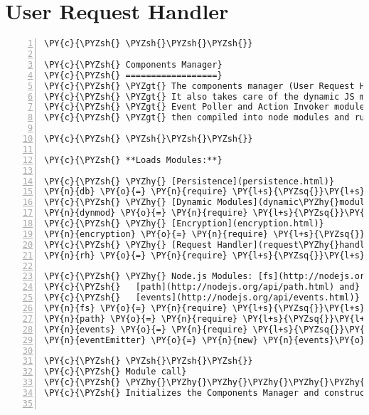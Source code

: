 \section{User Request Handler}
\begin{Verbatim}[fontsize=\scriptsize,commandchars=\\\{\},numbers=left,firstnumber=1,stepnumber=1]
\PY{c}{\PYZsh{} \PYZsh{}\PYZsh{}\PYZsh{}}

\PY{c}{\PYZsh{} Components Manager}
\PY{c}{\PYZsh{} ==================}
\PY{c}{\PYZsh{} \PYZgt{} The components manager (User Request Handler) is the interface for CRUD on ECA components.}
\PY{c}{\PYZsh{} \PYZgt{} It also takes care of the dynamic JS modules and the rules.}
\PY{c}{\PYZsh{} \PYZgt{} Event Poller and Action Invoker modules are loaded as strings and stored in the database,}
\PY{c}{\PYZsh{} \PYZgt{} then compiled into node modules and rules and used in the engine and event poller.}

\PY{c}{\PYZsh{} \PYZsh{}\PYZsh{}\PYZsh{}}

\PY{c}{\PYZsh{} **Loads Modules:**}

\PY{c}{\PYZsh{} \PYZhy{} [Persistence](persistence.html)}
\PY{n}{db} \PY{o}{=} \PY{n}{require} \PY{l+s}{\PYZsq{}}\PY{l+s}{./persistence}\PY{l+s}{\PYZsq{}}
\PY{c}{\PYZsh{} \PYZhy{} [Dynamic Modules](dynamic\PYZhy{}modules.html)}
\PY{n}{dynmod} \PY{o}{=} \PY{n}{require} \PY{l+s}{\PYZsq{}}\PY{l+s}{./dynamic\PYZhy{}modules}\PY{l+s}{\PYZsq{}}
\PY{c}{\PYZsh{} \PYZhy{} [Encryption](encryption.html)}
\PY{n}{encryption} \PY{o}{=} \PY{n}{require} \PY{l+s}{\PYZsq{}}\PY{l+s}{./encryption}\PY{l+s}{\PYZsq{}}
\PY{c}{\PYZsh{} \PYZhy{} [Request Handler](request\PYZhy{}handler.html)}
\PY{n}{rh} \PY{o}{=} \PY{n}{require} \PY{l+s}{\PYZsq{}}\PY{l+s}{./request\PYZhy{}handler}\PY{l+s}{\PYZsq{}}

\PY{c}{\PYZsh{} \PYZhy{} Node.js Modules: [fs](http://nodejs.org/api/fs.html),}
\PY{c}{\PYZsh{}   [path](http://nodejs.org/api/path.html) and}
\PY{c}{\PYZsh{}   [events](http://nodejs.org/api/events.html)}
\PY{n}{fs} \PY{o}{=} \PY{n}{require} \PY{l+s}{\PYZsq{}}\PY{l+s}{fs}\PY{l+s}{\PYZsq{}}
\PY{n}{path} \PY{o}{=} \PY{n}{require} \PY{l+s}{\PYZsq{}}\PY{l+s}{path}\PY{l+s}{\PYZsq{}}
\PY{n}{events} \PY{o}{=} \PY{n}{require} \PY{l+s}{\PYZsq{}}\PY{l+s}{events}\PY{l+s}{\PYZsq{}}
\PY{n}{eventEmitter} \PY{o}{=} \PY{n}{new} \PY{n}{events}\PY{o}{.}\PY{n}{EventEmitter}\PY{p}{(}\PY{p}{)}

\PY{c}{\PYZsh{} \PYZsh{}\PYZsh{}\PYZsh{}}
\PY{c}{\PYZsh{} Module call}
\PY{c}{\PYZsh{} \PYZhy{}\PYZhy{}\PYZhy{}\PYZhy{}\PYZhy{}\PYZhy{}\PYZhy{}\PYZhy{}\PYZhy{}\PYZhy{}\PYZhy{}}
\PY{c}{\PYZsh{} Initializes the Components Manager and constructs a new Event Emitter.}


\end{Verbatim}
